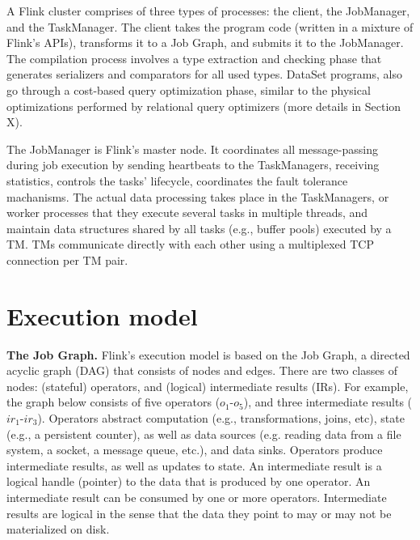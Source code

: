 \documentclass{sig-alternate}
\begin{document}
A Flink cluster comprises of three types of processes: the client, the JobManager, and the TaskManager. The client takes the program code (written in a mixture of Flink's APIs), transforms it to a Job Graph, and submits it to the JobManager. The compilation process involves a type extraction and checking phase that generates serializers and comparators for all used types. DataSet programs, also go through a cost-based query optimization phase, similar to the physical optimizations performed by relational query optimizers (more details in Section X).

The JobManager is Flink's master node. It coordinates all message-passing during job execution by sending heartbeats to the TaskManagers, receiving statistics, controls the tasks' lifecycle,  coordinates the fault tolerance machanisms. The actual data processing takes place in the TaskManagers, or worker processes that they execute several tasks in multiple threads, and maintain data structures shared by all tasks (e.g., buffer pools) executed by a TM. TMs communicate directly with each other using a multiplexed TCP connection per TM pair. 


\section{Execution model}

\textbf{The Job Graph.} Flink's execution model is based on the Job Graph, a directed acyclic graph (DAG) that consists of nodes and edges. There are two classes of nodes: (stateful) operators, and (logical) intermediate results (IRs). For example, the graph below consists of five operators ($o_1$-$o_5$), and three intermediate results ($ir_1$-$ir_3$). Operators abstract computation (e.g., transformations, joins, etc), state (e.g., a persistent counter), as well as data sources (e.g. reading data from a file system, a socket, a message queue, etc.), and data sinks. Operators produce intermediate results, as well as updates to state. An intermediate result is a logical handle (pointer) to the data that is produced by one operator. An intermediate result can be consumed by one or more operators. Intermediate results are logical in the sense that the data they point to may or may not be materialized on disk.

\end{document}
